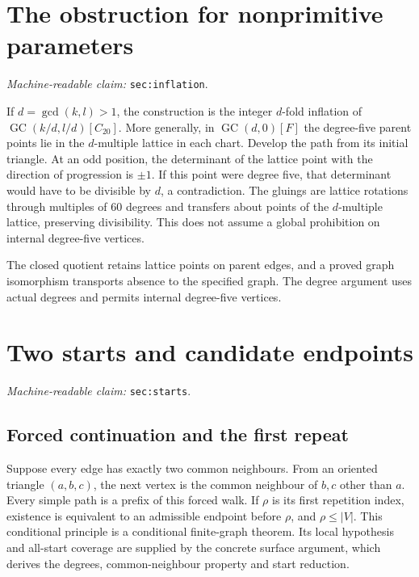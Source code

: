 \documentclass[11pt]{amsart}
\newcommand{\GC}{\operatorname{GC}}
\newcommand{\record}[1]{\nolinkurl{#1}}
\newcommand{\claimid}[1]{\par\nopagebreak\noindent\textit{Machine-readable claim:} \record{#1}.\par}
\begin{document}
\section{The obstruction for nonprimitive parameters}\label{sec:inflation}
\claimid{sec:inflation}
If $d=\gcd(k,l)>1$, the construction is the integer $d$-fold inflation
of $\GC(k/d,l/d)[C_{20}]$. More generally, in $\GC(d,0)[F]$ the
degree-five parent points lie in the $d$-multiple lattice in each chart.
Develop the path from its initial triangle. At an odd position, the
determinant of the lattice point with the direction of progression is
$\pm1$. If this point were degree five, that determinant would have to
be divisible by $d$, a contradiction. The gluings are lattice rotations
through multiples of $60$ degrees and transfers about points of the
$d$-multiple lattice, preserving divisibility. This does not assume a
global prohibition on internal degree-five vertices.

The closed quotient retains lattice points on parent edges, and a
proved graph isomorphism transports absence to the specified graph.
The degree argument uses actual degrees and permits internal
degree-five vertices.

\section{Two starts and candidate endpoints}\label{sec:starts}
\claimid{sec:starts}
\subsection{Forced continuation and the first repeat}
Suppose every edge has exactly two common neighbours. From an oriented
triangle $(a,b,c)$, the next vertex is the common neighbour of $b,c$
other than $a$. Every simple path is a prefix of this forced walk. If
$\rho$ is its first repetition index, existence is equivalent to an
admissible endpoint before $\rho$, and $\rho\le |V|$. This conditional
principle is a conditional finite-graph theorem. Its local hypothesis
and all-start coverage are supplied by the concrete surface argument,
which derives the degrees, common-neighbour property and start reduction.
\end{document}
